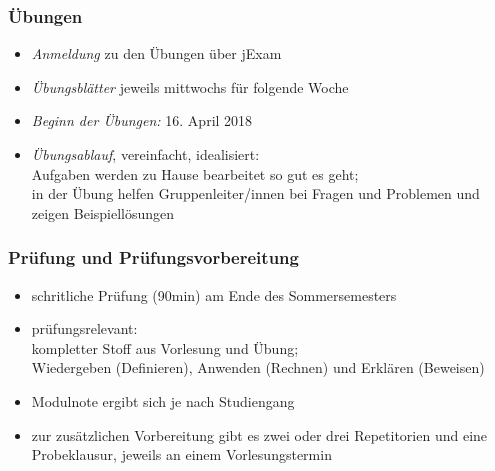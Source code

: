 \documentclass[aspectratio=1610,onlymath]{beamer}
\begin{document}
\begin{frame}\frametitle{Übungen}
\begin{itemize}
\item \emph{Anmeldung} zu den Übungen über jExam
\item \emph{Übungsblätter} jeweils mittwochs für folgende Woche
\item \emph{Beginn der Übungen:} 16. April 2018
\item \emph{Übungsablauf}, vereinfacht, idealisiert:\\
	Aufgaben werden zu Hause bearbeitet so gut es geht;\\
	in der Übung helfen Gruppenleiter/innen bei Fragen und Problemen und zeigen Beispiellösungen
\end{itemize}

\end{frame}


\begin{frame}\frametitle{Prüfung und Prüfungsvorbereitung}
\begin{itemize}
\item schritliche Prüfung (90min) am Ende des Sommersemesters
\item prüfungsrelevant:\\
	kompletter Stoff aus Vorlesung \alert{und} Übung;\\
	Wiedergeben (Definieren), Anwenden (Rechnen) und Erklären (Beweisen)
\item Modulnote ergibt sich je nach Studiengang
\item zur zusätzlichen Vorbereitung gibt es \alert{zwei oder drei Repetitorien} und \alert{eine Probeklausur}, jeweils an einem Vorlesungstermin
\end{itemize}

\end{frame}
\end{document}
